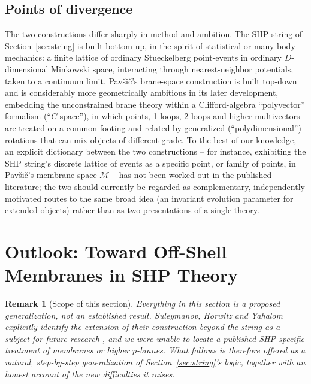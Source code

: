 \documentclass[11pt]{article}
\newtheorem{remark}{Remark}[section]
\begin{document}
\subsection{Points of divergence}

The two constructions differ sharply in method and ambition. The SHP string of
Section~\ref{sec:string} is built bottom-up, in the spirit of statistical or
many-body mechanics: a finite lattice of ordinary Stueckelberg point-events in
ordinary $D$-dimensional Minkowski space, interacting through nearest-neighbor
potentials, taken to a continuum limit. Pavši\v{c}'s brane-space construction
is built top-down and is considerably more geometrically ambitious in its
later development, embedding the unconstrained brane theory within a
Clifford-algebra ``polyvector'' formalism (``$C$-space''), in which points,
1-loops, 2-loops and higher multivectors are treated on a common footing and
related by generalized (``polydimensional'') rotations that can mix objects of
different grade. To the best of our knowledge, an explicit dictionary between
the two constructions -- for instance, exhibiting the SHP string's discrete
lattice of events as a specific point, or family of points, in Pavši\v{c}'s
membrane space $\mathcal M$ -- has not been worked out in the published
literature; the two should currently be regarded as complementary, independently
motivated routes to the same broad idea (an invariant evolution parameter for
extended objects) rather than as two presentations of a single theory.


\section{Outlook: Toward Off-Shell Membranes in SHP Theory}
\label{sec:outlook}

\begin{remark}[Scope of this section]
Everything in this section is a proposed generalization, not an established
result. Suleymanov, Horwitz and Yahalom explicitly identify the extension of
their construction beyond the string as a subject for future research
\cite{SuleymanovHorwitzYahalom2017}, and we were unable to locate a published
SHP-specific treatment of membranes or higher $p$-branes. What follows is
therefore offered as a natural, step-by-step generalization of
Section~\ref{sec:string}'s logic, together with an honest account of the new
difficulties it raises.
\end{remark}
\end{document}

